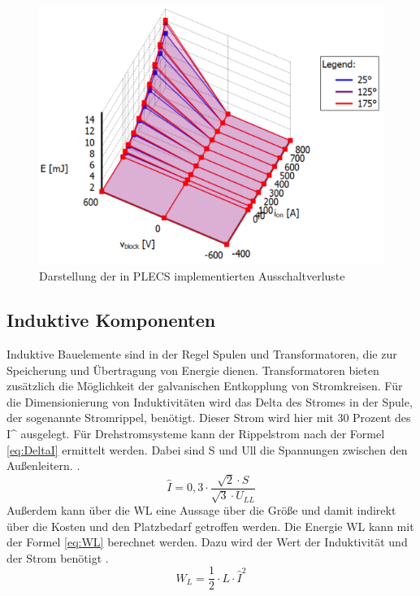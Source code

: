 		\begin{figure}
			\centering
			\includegraphics[width=0.7\linewidth]{content/Grafiken/PLECS_FF2ThermalModel}
			\caption{Darstellung der in PLECS implementierten Ausschaltverluste \cite{IFAGFF2}}
			\label{fig:plecsff2thermalmodel}
		\end{figure}
		
		\subsection{Induktive Komponenten}
		Induktive Bauelemente sind in der Regel Spulen und Transformatoren, die zur Speicherung und Übertragung von Energie dienen. Transformatoren bieten zusätzlich die Möglichkeit der galvanischen Entkopplung von Stromkreisen. 
		Für die Dimensionierung von Induktivitäten wird das Delta des Stromes in der Spule, der sogenannte Stromrippel, benötigt. Dieser Strom wird hier mit 30 Prozent des \gls{I^} ausgelegt. Für Drehstromsysteme kann der Rippelstrom nach der Formel \ref{eq:DeltaI} ermittelt werden. Dabei sind \gls{S} und \gls{Ull} die Spannungen zwischen den Außenleitern. \cite{Boge.2007}.\\
		\begin{equation}
			\label{eq:DeltaI}
			\hat{I} = 0,3 \cdot \dfrac{\sqrt{2} \cdot S}{\sqrt{3} \cdot U_{LL}}
		\end{equation}
		Außerdem kann über die \gls{WL} eine Aussage über die Größe und damit indirekt über die Kosten und den Platzbedarf getroffen werden. Die Energie \gls{WL} kann mit der Formel \ref{eq:WL} berechnet werden. Dazu wird der Wert der Induktivität und der Strom benötigt \cite{Boge.2007}.
		\begin{equation}
			\label{eq:WL}
			W_{L} =\dfrac{1}{2}\cdot L\cdot \hat{I}^{2}
		\end{equation}
		
